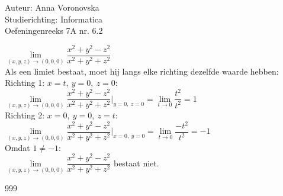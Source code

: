 \documentclass[a4paper]{article}
\begin{document}
  
\noindent \large Auteur: Anna Voronovska \\
\noindent \large Studierichting: Informatica\\
\noindent \large Oefeningenreeks 7A nr. 6.2\\

\medskip

\normalsize

$\lim\limits_{(x,y,z)\to(0,0,0)} \dfrac{x^2+y^2-z^2}{x^2+y^2+z^2}$\\

Als een limiet bestaat, moet hij langs elke richting dezelfde waarde hebben:\\

Richting 1: $x=t,\ y=0,\ z=0$:\\

$\lim\limits_{(x,y,z)\to(0,0,0)} \dfrac{x^2+y^2-z^2}{x^2+y^2+z^2}\bigg|_{y=0,\ z=0} = \lim\limits_{t\to 0}\dfrac{t^2}{t^2} = 1$\\

Richting 2: $x=0,\ y=0,\ z=t$:\\

$\lim\limits_{(x,y,z)\to(0,0,0)} \dfrac{x^2+y^2-z^2}{x^2+y^2+z^2}\bigg|_{x=0,\ y=0} = \lim\limits_{t\to 0}\dfrac{-t^2}{t^2} = -1$\\

Omdat $1 \neq -1$:\\

$\lim\limits_{(x,y,z)\to(0,0,0)} \dfrac{x^2+y^2-z^2}{x^2+y^2+z^2}$ bestaat niet.


\begin{thebibliography}{999}
\end{thebibliography}
\end{document}

